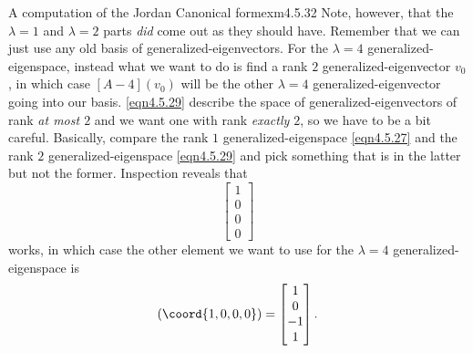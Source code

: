 \begin{exm}{A computation of the Jordan Canonical form}{exm4.5.32}
	Note, however, that the $\lambda =1$ and $\lambda =2$ parts \emph{did} come out as they should have.  Remember that we can just use any old basis of generalized-eigenvectors.  For the $\lambda =4$ generalized-eigenspace, instead what we want to do is find a rank $2$ generalized-eigenvector $v_0$, in which case $[A-4](v_0)$ will be the other $\lambda =4$ generalized-eigenvector going into our basis.  \eqref{eqn4.5.29} describe the space of generalized-eigenvectors of rank \emph{at most $2$} and we want one with rank \emph{exactly $2$}, so we have to be a bit careful.  Basically, compare the rank $1$ generalized-eigenspace \eqref{eqn4.5.27} and the rank $2$ generalized-eigenspace \eqref{eqn4.5.29} and pick something that is in the latter but not the former.  Inspection reveals that
	\begin{equation}
		\begin{bmatrix}1 \\ 0 \\ 0 \\ 0\end{bmatrix}
	\end{equation}
	works, in which case the other element we want to use for the $\lambda =4$ generalized-eigenspace is
	\begin{equation}
		[A-4](\coord{1,0,0,0})=\begin{bmatrix}1 \\ 0 \\ -1 \\ 1\end{bmatrix}.
	\end{equation}
	

\end{exm}
